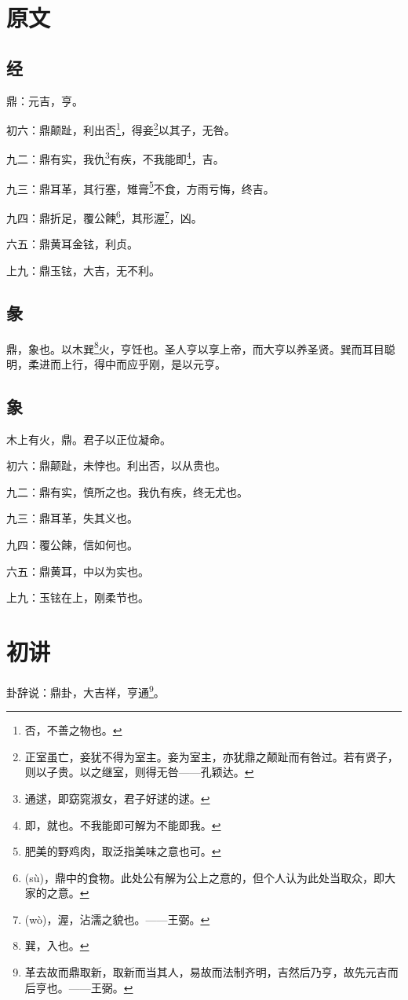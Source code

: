 \documentclass[12pt,oneside]{book}
\begin{document}
\section{原文}

\subsection{经}
鼎：元吉，亨。

初六：鼎颠趾，利出否\footnote{否，不善之物也。}，得妾\footnote{正室虽亡，妾犹不得为室主。妾为室主，亦犹鼎之颠趾而有咎过。若有贤子，则以子贵。以之继室，则得无咎——孔颖达。}以其子，无咎。

九二：鼎有实，我仇\footnote{通逑，即窈窕淑女，君子好逑的逑。}有疾，不我能即\footnote{即，就也。不我能即可解为不能即我。}，吉。

九三：鼎耳革，其行塞，雉膏\footnote{肥美的野鸡肉，取泛指美味之意也可。}不食，方雨亏悔，终吉。

九四：鼎折足，覆公餗\footnote{(sù)，鼎中的食物。此处公有解为公上之意的，但个人认为此处当取众，即大家的之意。}，其形渥\footnote{(wò)，渥，沾濡之貌也。——王弼。}，凶。

六五：鼎黄耳金铉，利贞。

上九：鼎玉铉，大吉，无不利。

\subsection{彖}
鼎，象也。以木巽\footnote{巽，入也。}火，亨饪也。圣人亨以享上帝，而大亨以养圣贤。巽而耳目聪明，柔进而上行，得中而应乎刚，是以元亨。

\subsection{象}
木上有火，鼎。君子以正位凝命。

初六：鼎颠趾，未悖也。利出否，以从贵也。

九二：鼎有实，慎所之也。我仇有疾，终无尤也。

九三：鼎耳革，失其义也。

九四：覆公餗，信如何也。

六五：鼎黄耳，中以为实也。

上九：玉铉在上，刚柔节也。

\section{初讲}
卦辞说：鼎卦，大吉祥，亨通\footnote{革去故而鼎取新，取新而当其人，易故而法制齐明，吉然后乃亨，故先元吉而后亨也。——王弼。}。
\end{document}
